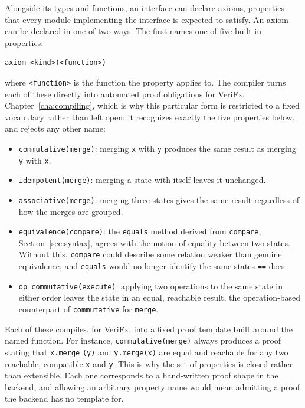 Alongside its types and functions, an interface can declare axioms, properties that every module implementing the
interface is expected to satisfy. An axiom can be declared in one of two ways. The first names one of five built-in
properties:

\begin{verbatim}
axiom <kind>(<function>)
\end{verbatim}

where \texttt{<function>} is the function the property applies to. The compiler turns each of these directly into
automated proof obligations for VeriFx, Chapter~\ref{cha:compiling}, which is why this particular form is restricted to a fixed vocabulary
rather than left open: it recognizes exactly the five properties below, and rejects any other name:

\begin{itemize}
  \item \texttt{commutative(merge)}: merging \texttt{x} with \texttt{y} produces the same result as merging \texttt{y}
  with \texttt{x}.
  \item \texttt{idempotent(merge)}: merging a state with itself leaves it unchanged.
  \item \texttt{associative(merge)}: merging three states gives the same result regardless of how the merges are grouped.
  \item \texttt{equivalence(compare)}: the \texttt{equals} method derived from \texttt{compare}, Section~\ref{sec:syntax}, agrees with
  the notion of equality between two states. Without this, \texttt{compare} could describe some relation weaker than
  genuine equivalence, and \texttt{equals} would no longer identify the same states \texttt{==} does.
  \item \texttt{op\_commutative(execute)}: applying two operations to the same state in either order leaves the state in
  an equal, reachable result, the operation-based counterpart of \texttt{commutative} for \texttt{merge}.
\end{itemize}

Each of these compiles, for VeriFx, into a fixed proof template built around the named function. For instance,
\texttt{commutative(merge)} always produces a proof stating that \texttt{x.merge} \texttt{(y)} and \texttt{y.merge(x)} are equal
and reachable for any two reachable, compatible \texttt{x} and \texttt{y}. This is why the set of properties is closed
rather than extensible. Each one corresponds to a hand-written proof shape in the backend, and allowing an arbitrary
property name would mean admitting a proof the backend has no template for.

